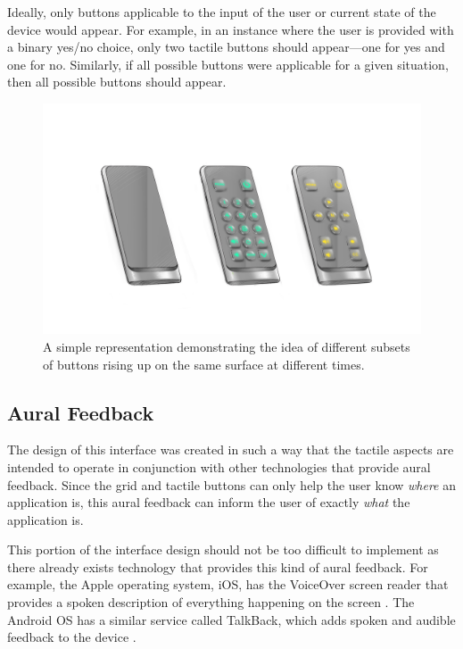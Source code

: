 \documentclass[11pt]{article}
\begin{document}
Ideally, only buttons applicable to the input of the user or current state of the device would appear. For example, in an instance where the user is provided with a binary yes/no choice, only two tactile buttons should appear---one for yes and one for no. Similarly, if all possible buttons were applicable for a given situation, then all possible buttons should appear.

\begin{figure}[ht]
\centering
\includegraphics[width=6in]{buttons.jpg}
\caption{A simple representation demonstrating the idea of different subsets of buttons rising up on the same surface at different times.}
\label{buttons}
\end{figure}

\subsection{Aural Feedback}
The design of this interface was created in such a way that the tactile aspects are intended to operate in conjunction with other technologies that provide aural feedback. Since the grid and tactile buttons can only help the user know \textit{where} an application is, this aural feedback can inform the user of exactly \textit{what} the application is.

This portion of the interface design should not be too difficult to implement as there already exists technology that provides this kind of aural feedback. For example, the Apple operating system, iOS, has the VoiceOver screen reader that provides a spoken description of everything happening on the screen \cite{VoiceOver}. The Android OS has a similar service called TalkBack, which adds spoken and audible feedback to the device \cite{TalkBack}.
\end{document}
